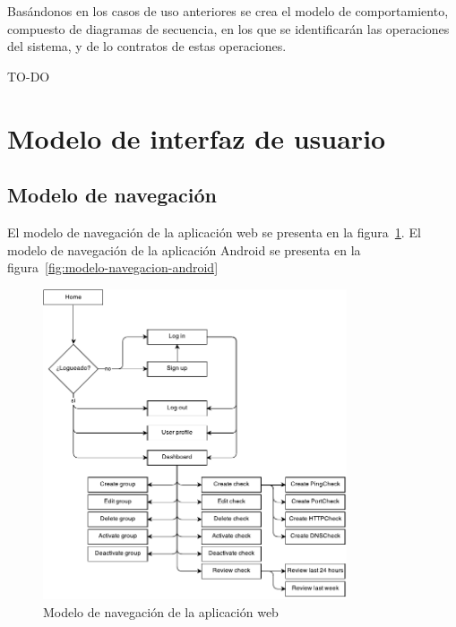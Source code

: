 Basándonos en los casos de uso anteriores se crea el modelo de comportamiento,
compuesto de diagramas de secuencia, en los que se identificarán las operaciones
del sistema, y de lo contratos de estas operaciones.

{\Huge TO-DO }



\section{Modelo de interfaz de usuario}

\subsection{Modelo de navegación}

El modelo de navegación de la aplicación web se presenta en la
figura~\ref{fig:modelo-navegacion-web}. El modelo de navegación de la aplicación
Android se presenta en la figura~\ref{fig:modelo-navegacion-android}

\begin{figure}[hbtp]
  \centering
  \includegraphics[width=0.8\textwidth]{4_analisis/diagrama_navegacion}
  \caption{Modelo de navegación de la aplicación web}
  \label{fig:modelo-navegacion-web}
\end{figure}

